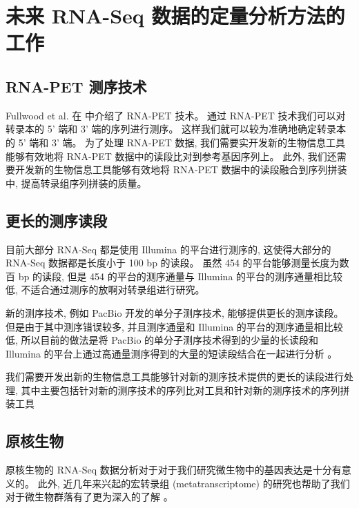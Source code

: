 \section{未来 RNA-Seq 数据的定量分析方法的工作}

\subsection{RNA-PET 测序技术} %
Fullwood et al. 在  中介绍了 RNA-PET 技术。 
通过 RNA-PET 技术我们可以对转录本的 5' 端和 3' 端的序列进行测序。 
这样我们就可以较为准确地确定转录本的 5' 端和 3' 端。 
为了处理 RNA-PET 数据, 我们需要实开发新的生物信息工具能够有效地将 RNA-PET 
数据中的读段比对到参考基因序列上。 此外, 我们还需要开发新的生物信息工具能够有效地将 RNA-PET 
数据中的读段融合到序列拼装中, 提高转录组序列拼装的质量。 

\subsection{更长的测序读段} %
目前大部分 RNA-Seq 都是使用 Illumina 的平台进行测序的, 
这使得大部分的 RNA-Seq 数据都是长度小于 100 bp 的读段。 
虽然 454 的平台能够测量长度为数百 bp 的读段, 
但是 454 的平台的测序通量与 Illumina 的平台的测序通量相比较低, 
不适合通过测序的放啊对转录组进行研究。 

新的测序技术, 例如 PacBio 开发的单分子测序技术, 能够提供更长的测序读段。 
但是由于其中测序错误较多, 并且测序通量和 Illumina 的平台的测序通量相比较低, 
所以目前的做法是将 PacBio 的单分子测序技术得到的少量的长读段和 Illumina 
的平台上通过高通量测序得到的大量的短读段结合在一起进行分析 \cite{hybrid.rna.seq.2012}。 

我们需要开发出新的生物信息工具能够针对新的测序技术提供的更长的读段进行处理, 
其中主要包括针对新的测序技术的序列比对工具和针对新的测序技术的序列拼装工具

\subsection{原核生物}
原核生物的 RNA-Seq 数据分析对于对于我们研究微生物中的基因表达是十分有意义的。 
此外, 近几年来兴起的宏转录组 (metatranscriptome) 的研究也帮助了我们对于微生物群落有了更为深入的了解
\cite{gilbert2008detection, urich2008simultaneous, gifford2010quantitative, 
helbling2011activity, mason2012metagenome, huson2011integrative, 
lesniewski2012metatranscriptome}。 

\nocite{sorek2009prokaryotic}

